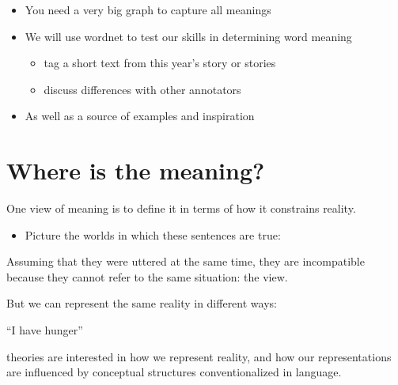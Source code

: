 \documentclass[a4paper,landscape,headrule,footrule,xetex]{foils}
\begin{document}
\begin{itemize}
\item You need a very big graph to capture all meanings
\end{itemize}





\begin{itemize}
\item We will use wordnet to test our skills in determining word meaning
  \begin{itemize}
  \item tag a short text from this year's story or stories
  \item discuss differences with other annotators
 \end{itemize}
\item As well as a source of examples and inspiration
\end{itemize}







\section{Where is the meaning?}






One view of meaning is to define it in terms of how it constrains reality.

\begin{itemize}
\item Picture the worlds in which these sentences are true:
  \begin{exe}
    \ex {}
    \ex {}
  \end{exe}
\end{itemize}

Assuming that they were uttered at the same time, they are
incompatible because they cannot refer to the same
situation: the  view. 

But we can represent the same reality in different ways:

\begin{exe}
  \ex {} ``I have hunger''
  \ex {}
\end{exe}

 theories are interested in how we represent reality,
and how our representations are influenced by conceptual structures
conventionalized in language.
\end{document}
